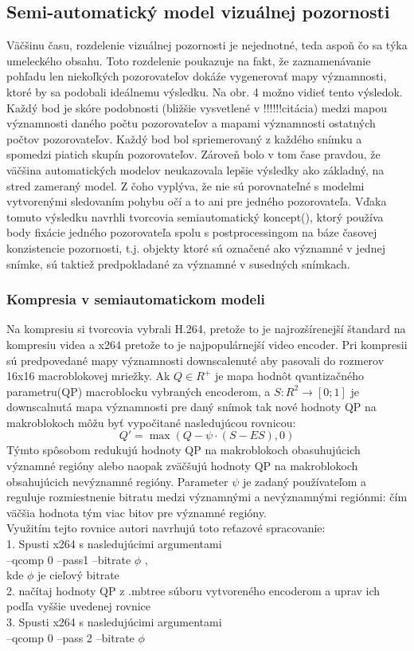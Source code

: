 \documentclass[10pt,twoside,slovak,a4paper]{article}
\begin{document}
\subsection{Semi-automatický model vizuálnej pozornosti} \label{semi-auto}
Väčšinu času, rozdelenie vizuálnej pozornosti je nejednotné, teda aspoň čo sa týka umeleckého obsahu. Toto rozdelenie poukazuje na fakt, že zaznamenávanie pohľadu len niekoľkých pozorovateľov dokáźe vygenerovať mapy významnosti, ktoré by sa podobali ideálnemu výsledku. Na obr. 4 možno vidieť tento výsledok. Každý bod je skóre podobnosti (bližšie vysvetlené v !!!!!!citácia) medzi mapou významnosti daného počtu pozorovateľov a mapami významnosti ostatných počtov pozorovateľov. Každý bod bol spriemerovaný z každého snímku a spomedzi piatich skupín pozorovateľov. Zároveň bolo v tom čase pravdou, že väčšina automatických modelov neukazovala lepšie výsledky ako základný, na stred zameraný model. Z čoho vyplýva, že nie sú porovnateľné s modelmi vytvorenými sledovaním pohybu očí a to ani pre jedného pozorovateľa. Vďaka tomuto výsledku navrhli tvorcovia\cite{Coplien:MPD} semiautomatický koncept(), ktorý používa body fixácie jedného pozorovateľa spolu s postprocessingom na báze časovej konzistencie pozornosti, t.j. objekty ktoré sú označené ako významné v jednej snímke, sú taktiež predpokladané za významné v susedných snímkach.
\subsubsection{Kompresia v semiautomatickom modeli}
Na kompresiu si tvorcovia\cite{Coplien:MPD} vybrali H.264, pretože to je najrozšírenejší štandard na kompresiu videa a x264 pretože to je najpopulárnejší video encoder. Pri kompresii sú predpovedané mapy významnosti downscalenuté aby pasovali do rozmerov 16x16 macroblokovej mriežky. Ak  \(Q \in R^+\) je mapa hodnôt qvantizačného parametru(QP) macroblocku vybraných encoderom, a \(S : R^2\rightarrow [0;1]\) je downscalnutá mapa významnosti pre daný snímok tak nové hodnoty QP na makroblokoch môžu byť vypočitané nasledujúcou rovnicou:
\[{Q}' = \max(Q - \psi \cdot (S - ES),0)\]
Týmto spôsobom redukujú hodnoty QP na makroblokoch obasuhujúcich významné regióny alebo naopak zväčšujú hodnoty QP na makroblokoch obsahujúcich nevýznamné regióny. Parameter \(\psi\) je zadaný používateľom a reguluje rozmiestnenie bitratu medzi významnými a nevýznamnými regiónmi: čím väčšia hodnota tým viac bitov pre významné regióny.\\
Využitím tejto rovnice autori\cite{Coplien:MPD} navrhujú toto reťazové spracovanie:\\
1. Spusti x264 s nasledujúcimi argumentami\\
--qcomp 0 --pass1 --bitrate \( \phi\) ,\\
kde \( \phi\) je cieľový bitrate\\
2. načítaj hodnoty QP z .mbtree súboru vytvoreného encoderom a uprav ich podľa vyššie uvedenej rovnice \\
3. Spusti x264 s nasledujúcimi argumentami\\
--qcomp 0 --pass 2 --bitrate \(\phi\)\\
\end{document}
